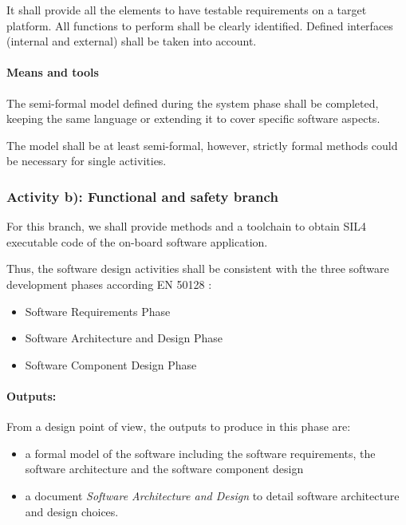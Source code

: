 It shall provide all the elements to have testable requirements on a target platform. All functions to perform shall be clearly identified. Defined interfaces (internal and external) shall be  taken into account.


\paragraph{Means and tools}
\label{sec:sw-means}

The semi-formal model defined during the system phase shall be completed, keeping the same language or extending it to  cover specific software aspects.

The model  shall be at least semi-formal, however, strictly  formal  methods could be necessary for single activities.

\subsubsection{Activity b): Functional and safety branch}

For this branch, we shall provide methods and a toolchain to  obtain SIL4 executable code of the on-board software application. 

Thus, the software design activities shall be consistent with the three software development phases according EN 50128 :

\begin{itemize}
\item Software Requirements Phase
\item Software Architecture and Design Phase
\item Software Component Design Phase
\end{itemize}

\paragraph{Outputs:}
\label{sec:sw-req-documents}
From a design point of view, the outputs to produce in this phase are:

\begin{itemize}
\item a formal model of the software including the software requirements, the software architecture and the software component design
\item  a document  \textit{Software Architecture and Design} to  detail software architecture and design choices.
\end{itemize}


